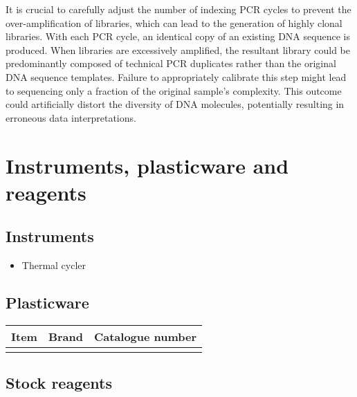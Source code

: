 \documentclass[
]{book}
\providecommand{\tightlist}{%
  \setlength{\itemsep}{0pt}\setlength{\parskip}{0pt}}
\begin{document}
It is crucial to carefully adjust the number of indexing PCR cycles to prevent the over-amplification of libraries, which can lead to the generation of highly clonal libraries. With each PCR cycle, an identical copy of an existing DNA sequence is produced. When libraries are excessively amplified, the resultant library could be predominantly composed of technical PCR duplicates rather than the original DNA sequence templates. Failure to appropriately calibrate this step might lead to sequencing only a fraction of the original sample's complexity. This outcome could artificially distort the diversity of DNA molecules, potentially resulting in erroneous data interpretations.

\hypertarget{instruments-plasticware-and-reagents-4}{%
\section{Instruments, plasticware and reagents}\label{instruments-plasticware-and-reagents-4}}

\hypertarget{instruments-4}{%
\subsection*{Instruments}\label{instruments-4}}

\begin{itemize}
\tightlist
\item
  Thermal cycler
\end{itemize}

\hypertarget{plasticware-4}{%
\subsection*{Plasticware}\label{plasticware-4}}

\begin{longtable}[]{@{}lll@{}}
\toprule\noalign{}
Item & Brand & Catalogue number \\
\midrule\noalign{}
\endhead
\bottomrule\noalign{}
\endlastfoot
& & \\
\end{longtable}

\hypertarget{stock-reagents-3}{%
\subsection*{Stock reagents}\label{stock-reagents-3}}
\end{document}
